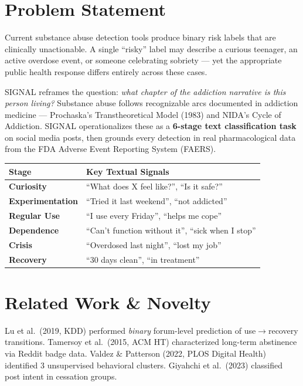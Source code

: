 \documentclass[10pt,twocolumn]{article}
\begin{document}
\section{Problem Statement}

Current substance abuse detection tools produce binary risk labels that are
clinically unactionable. A single ``risky'' label may describe a curious
teenager, an active overdose event, or someone celebrating sobriety --- yet the
appropriate public health response differs entirely across these cases.

SIGNAL reframes the question: \textit{what chapter of the addiction narrative
is this person living?} Substance abuse follows recognizable arcs documented
in addiction medicine --- Prochaska's Transtheoretical Model (1983) and NIDA's
Cycle of Addiction. SIGNAL operationalizes these as a \textbf{6-stage text
classification task} on social media posts, then grounds every detection in
real pharmacological data from the FDA Adverse Event Reporting System (FAERS).

\begin{center}{\small
\begin{tabular}{@{}p{1.55cm}p{3.85cm}@{}}
\toprule
\textbf{\color{secblue}Stage} & \textbf{Key Textual Signals}\\
\midrule
\textcolor{signalc}{\textbf{Curiosity}}       & ``What does X feel like?'', ``Is it safe?''\\[1pt]
\textcolor{signalb}{\textbf{Experimentation}} & ``Tried it last weekend'', ``not addicted''\\[1pt]
\textcolor{signalo!80!black}{\textbf{Regular Use}} & ``I use every Friday'', ``helps me cope''\\[1pt]
\textcolor{signalo}{\textbf{Dependence}}      & ``Can't function without it'', ``sick when I stop''\\[1pt]
\textcolor{signalr}{\textbf{Crisis}}          & ``Overdosed last night'', ``lost my job''\\[1pt]
\textcolor{signalg}{\textbf{Recovery}}        & ``30 days clean'', ``in treatment''\\
\bottomrule
\end{tabular}}\end{center}

\section{Related Work \& Novelty}

Lu et al.\ (2019, KDD) performed \textit{binary} forum-level prediction of
use$\to$recovery transitions. Tamersoy et al.\ (2015, ACM HT) characterized
long-term abstinence via Reddit badge data. Valdez \& Patterson (2022, PLOS
Digital Health) identified 3 unsupervised behavioral clusters. Giyahchi et
al.\ (2023) classified post intent in cessation groups.
\end{document}
